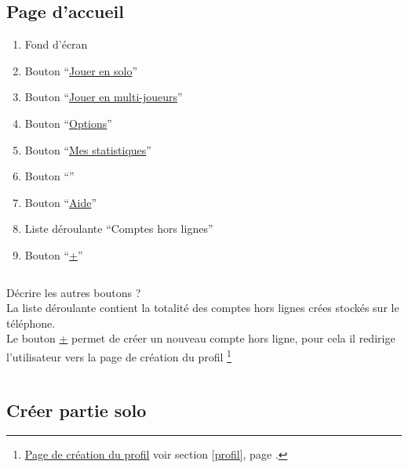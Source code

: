 \documentclass{report}
\begin{document}
		$\,$
	
\newpage

	\subsection{Page d'accueil}
		\hypertarget{Page d'accueil}{}
		\label{accueil}
	
		
		
		\begin{enumerate}
		  \item Fond d'écran
		  \item Bouton ``\hyperlink{Creer partie solo}{Jouer en solo}''
		  \item Bouton ``\hyperlink{Connexion multi-joueurs}{Jouer en multi-joueurs}''
		  \item Bouton ``\hyperlink{Options}{Options}''
		  \item Bouton ``\hyperlink{Statistiques}{Mes statistiques}''
		  \item Bouton ``''
		  \item Bouton ``\hyperlink{Aide}{Aide}''
		  \item Liste déroulante ``Comptes hors lignes''
		  \item Bouton ``\hyperlink{Création du profil}{+}'' 
		\end{enumerate}
		
		$\,$
		
		Décrire les autres boutons ? \\		
		La liste déroulante contient la totalité des comptes hors lignes crées stockés
		sur le téléphone. \\
		Le bouton \hyperlink{Création du profil}{+} permet de créer un nouveau compte
		hors ligne, pour cela il redirige l'utilisateur vers la page de création du profil%
		\footnote[1]{
			\hyperlink{Création du profil}{Page de création du profil}
			\og voir section \ref{profil}, page \pageref{profil}.\fg
		}
		
		$\,$
	
\newpage

	\subsection{Créer partie solo}
	
		\hypertarget{Creer partie solo}{}
		\label{Creer partie solo}
	
		
		
\end{document}
